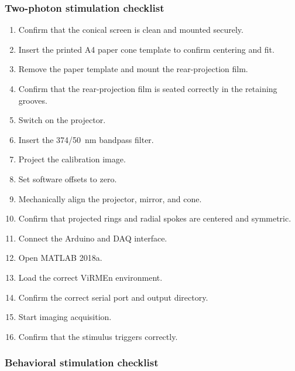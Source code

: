 \subsubsection{Two-photon stimulation checklist}

\begin{enumerate}
    \item Confirm that the conical screen is clean and mounted securely.
    \item Insert the printed A4 paper cone template to confirm centering and fit.
    \item Remove the paper template and mount the rear-projection film.
    \item Confirm that the rear-projection film is seated correctly in the retaining grooves.
    \item Switch on the projector.
    \item Insert the 374/50~nm bandpass filter.
    \item Project the calibration image.
    \item Set software offsets to zero.
    \item Mechanically align the projector, mirror, and cone.
    \item Confirm that projected rings and radial spokes are centered and symmetric.
    \item Connect the Arduino and DAQ interface.
    \item Open MATLAB 2018a.
    \item Load the correct ViRMEn environment.
    \item Confirm the correct serial port and output directory.
    \item Start imaging acquisition.
    \item Confirm that the stimulus triggers correctly.
\end{enumerate}

\subsubsection{Behavioral stimulation checklist}

